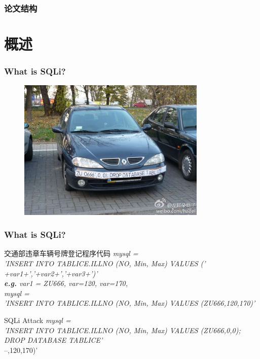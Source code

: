 \documentclass{beamer}
\begin{document}
\begin{CJK*}{UTF8}{}
\begin{frame}
\frametitle{论文结构}
\tableofcontents 
\end{frame}


\section{概述}
\begin{frame}
\frametitle{What is SQLi?}
\begin{figure}  
 \centering  
 \includegraphics[width=90mm]{sqli.png}\\  
\end{figure}
\end{frame}

\begin{frame}
\frametitle{What is SQLi?}
\begin{block}{交通部违章车辆号牌登记程序代码}
\emph{mysql = \\'INSERT INTO TABLICE.ILLNO (NO, Min, Max) VALUES ('\\
+var1+','+var2+','+var3+')'\bigskip\\
{\bf e.g.} var1 = ZU666, var=120, var=170,\\
mysql = \\'INSERT INTO TABLICE.ILLNO (NO, Min, Max) VALUES (ZU666,120,170)'}
\end{block}
\begin{block}{SQLi Attack}
\emph{mysql = \\'INSERT INTO TABLICE.ILLNO (NO, Min, Max) VALUES (ZU666,0,0);\\DROP DATABASE TABLICE'\\}
--,120,170)'
\end{block}


\end{frame}
\end{CJK*}
\end{document}
